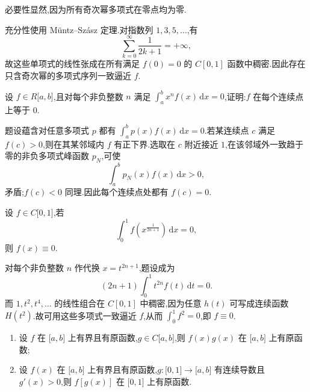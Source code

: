 \begin{solution}
    必要性显然,因为所有奇次幂多项式在零点均为零.

    充分性使用 M\"untz--Sz\'asz 定理.对指数列 $1,3,5,\ldots$,有
    \[
        \displaystyle\sum\limits_{k=0}^{\infty}\dfrac{1}{2k+1}=+\infty,
    \]
    故这些单项式的线性张成在所有满足 $f(0)=0$ 的 $C[0,1]$ 函数中稠密.因此存在只含奇次幂的多项式序列一致逼近 $f$.
\end{solution}

\begin{example}
    设 $f\in R\lbrack a,b\rbrack$,且对每个非负整数 $n$ 满足 $\displaystyle\int_a^bx^nf(x)\,\mathrm{d}x=0$,证明:$f$ 在每个连续点上等于 $0$.
\end{example}
\exampleblank

\begin{solution}
    题设蕴含对任意多项式 $p$ 都有 $\displaystyle\int_a^bp(x)f(x)\,\mathrm{d}x=0$.若某连续点 $c$ 满足 $f(c)>0$,则在其某邻域内 $f$ 有正下界.选取在 $c$ 附近接近 $1$,在该邻域外一致趋于零的非负多项式峰函数 $p_N$,可使
    \[
        \displaystyle\int_a^bp_N(x)f(x)\,\mathrm{d}x>0,
    \]
    矛盾;$f(c)<0$ 同理.因此每个连续点处都有 $f(c)=0$.
\end{solution}

\begin{example}
    设 $f\in C\lbrack 0,1\rbrack$,若
    \[
        \displaystyle\int_0^1f\left(x^{\frac{1}{2n+1}}\right)\,\mathrm{d}x=0,
    \]
    则 $f(x)\equiv0$.
\end{example}
\exampleblank

\begin{solution}
    对每个非负整数 $n$ 作代换 $x=t^{2n+1}$,题设成为
    \[
        (2n+1)\int_0^1t^{2n}f(t)\,\mathrm{d}t=0.
    \]
    而 $1,t^2,t^4,\ldots$ 的线性组合在 $C[0,1]$ 中稠密,因为任意
    $h(t)$ 可写成连续函数 $H(t^2)$.故可用这些多项式一致逼近 $f$,从而
    $\displaystyle\int_0^1f^2=0$,即 $f\equiv0$.
\end{solution}

\begin{example}
    \begin{enumerate}
        \item 设 $f$ 在 $\lbrack a,b\rbrack$ 上有界且有原函数,$g\in C\lbrack a,b\rbrack$,则 $f(x)g(x)$ 在 $\lbrack a,b\rbrack$ 上有原函数;
        \item 设 $f(x)$ 在 $\lbrack a,b\rbrack$ 上有界且有原函数,$g:\lbrack 0,1\rbrack\to\lbrack a,b\rbrack$ 有连续导数且 $g'(x)>0$,则 $f[g(x)]$ 在 $\lbrack 0,1\rbrack$ 上有原函数.
    \end{enumerate}
\end{example}
\exampleblank

